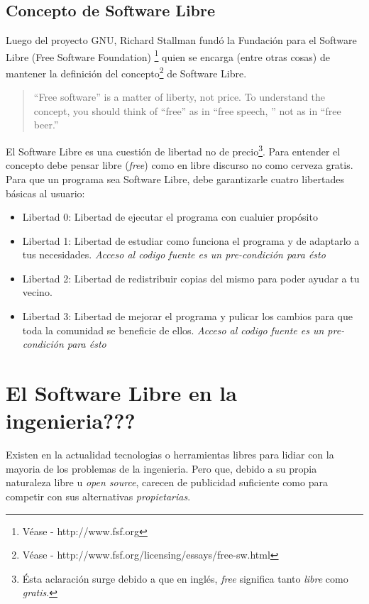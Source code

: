 
\subsection{Concepto de Software Libre}
Luego del proyecto GNU, Richard Stallman fund\'o la Fundaci\'on para el 
Software Libre (Free Software Foundation)
\footnote{V\'ease - http://www.fsf.org} quien se encarga (entre otras cosas) de
mantener la definici\'on del concepto\footnote{V\'ease -
http://www.fsf.org/licensing/essays/free-sw.html} de Software Libre.

\begin{quote}
``Free software'' is a matter of liberty, not price. 
To understand the concept, you should think of ``free'' as in ``free speech,
'' not as in ``free beer.''
\end{quote}

El Software Libre es una cuesti\'on de libertad no de precio\footnote{\'Esta
aclaraci\'on surge debido a que en ingl\'es, \emph{free} significa tanto
\emph{libre} como \emph{gratis}.}. Para entender el concepto debe pensar libre
(\emph{free}) como en libre discurso no como cerveza gratis.\\


Para que un programa sea Software Libre, debe garantizarle cuatro libertades
b\'asicas al usuario:

\begin{itemize}
\item Libertad 0: Libertad de ejecutar el programa con cualuier prop\'osito
\item Libertad 1: Libertad de estudiar como funciona el programa y de adaptarlo
a tus necesidades. \emph{Acceso al codigo fuente es un pre-condici\'on para
\'esto}
\item Libertad 2: Libertad de redistribuir copias del mismo para poder ayudar a
tu vecino.
\item Libertad 3: Libertad de mejorar el programa y pulicar los cambios para
que toda la comunidad se beneficie de ellos. \emph{Acceso al codigo fuente es 
un pre-condici\'on para \'esto}
\end{itemize}



\section{El Software Libre en la ingenieria???} 
Existen en la actualidad tecnologias o herramientas libres para lidiar con la
mayoria de los problemas de la ingenieria. Pero que, debido a su propia
naturaleza libre u \emph{open source}, carecen de publicidad suficiente como
para competir con sus alternativas \emph{propietarias}. \\

